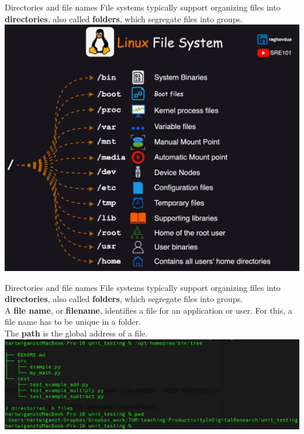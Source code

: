 \documentclass{setbeamer}
\begin{document}
\begin{frame}{Directories and file names}
	File systems typically support organizing files into \textbf{directories}, also called \textbf{folders}, which segregate files into groups. \\


\includegraphics[width=.5\columnwidth]{resources/folders.png}


\end{frame}



\begin{frame}{Directories and file names}
	File systems typically support organizing files into \textbf{directories}, also called \textbf{folders}, which segregate files into groups. \\
	
A \textbf{file name}, or \textbf{filename}, identifies a file for an application or user. For this, a file name has to be unique in a folder. \\

The \textbf{path} is the global address of a file.\\


\includegraphics[width=.95\columnwidth]{resources/folder_filenames.png}


\end{frame}
\end{document}
